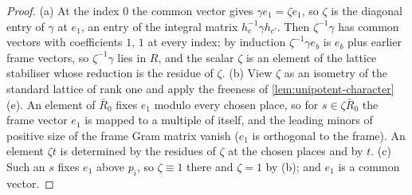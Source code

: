 \begin{proof}
(a) At the index $0$ the common vector gives $\gamma e_1=\zeta e_1$, so $\zeta$ is the diagonal entry of $\gamma$ at $e_1$, an entry of the integral matrix $h_c^{-1}\gamma h_{c'}$. Then $\zeta^{-1}\gamma$ has common vectors with coefficients $1$, $1$ at every index; by induction $\zeta^{-1}\gamma e_b$ is
$e_b$ plus earlier frame vectors, so $\zeta^{-1}\gamma$ lies in $R$, and the scalar $\zeta$ is an element of the lattice stabiliser whose reduction is the residue of $\zeta$. (b) View $\zeta$ as an isometry of the standard lattice of rank one and apply the freeness of
\cref{lem:unipotent-character}(e). An element of $\bar R_0$ fixes $e_1$ modulo every chosen place, so for $s\in\zeta\bar R_0$ the frame vector $e_1$ is mapped to a multiple of itself, and the leading minors of positive size of the frame Gram matrix vanish ($e_1$ is
orthogonal to the frame). An element $\zeta t$ is determined by the residues of $\zeta$ at the chosen places and by $t$. (c) Such an $s$ fixes $e_1$ above $p_i$, so $\zeta\equiv1$ there and $\zeta=1$ by (b); and $e_1$ is a common vector.
\end{proof}

